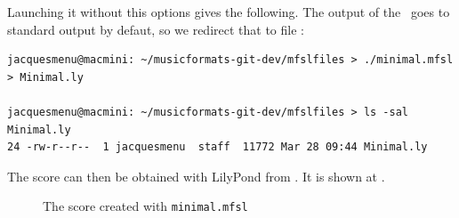 Launching it without this options gives the following. The output of the \mfslInterp\ goes to standard output by defaut, so we redirect that to file :
\begin{lstlisting}[language=Terminal]
jacquesmenu@macmini: ~/musicformats-git-dev/mfslfiles > ./minimal.mfsl > Minimal.ly

jacquesmenu@macmini: ~/musicformats-git-dev/mfslfiles > ls -sal Minimal.ly
24 -rw-r--r--  1 jacquesmenu  staff  11772 Mar 28 09:44 Minimal.ly
\end{lstlisting}

The score can then be obtained with LilyPond from . It is shown at .
\begin{figure}[p]
\begin{center}
\caption {The score created with {\tt minimal.mfsl}}
\label{The score created with minimal.mfsl}


\end{center}
\end{figure}
